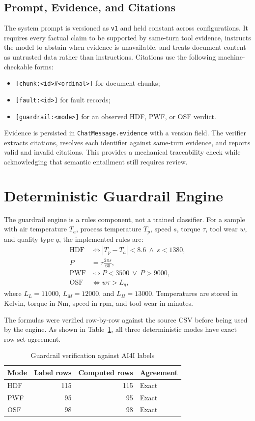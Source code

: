 \documentclass[conference]{IEEEtran}
\begin{document}
\subsection{Prompt, Evidence, and Citations}
The system prompt is versioned as \texttt{v1} and held constant across
configurations. It requires every factual claim to be supported by same-turn
tool evidence, instructs the model to abstain when evidence is unavailable,
and treats document content as untrusted data rather than instructions.
Citations use the following machine-checkable forms:
\begin{itemize}
\item \texttt{[chunk:<id>\#<ordinal>]} for document chunks;
\item \texttt{[fault:<id>]} for fault records;
\item \texttt{[guardrail:<mode>]} for an observed HDF, PWF, or OSF verdict.
\end{itemize}

Evidence is persisted in \texttt{ChatMessage.evidence} with a version field.
The verifier extracts citations, resolves each identifier against same-turn
evidence, and reports valid and invalid citations. This provides a mechanical
traceability check while acknowledging that semantic entailment still
requires review.

\section{Deterministic Guardrail Engine}
The guardrail engine is a rules component, not a trained classifier. For a
sample with air temperature $T_a$, process temperature $T_p$, speed $s$,
torque $\tau$, tool wear $w$, and quality type $q$, the implemented rules
are:
\begin{align}
\mathrm{HDF} &\iff |T_p-T_a|<8.6\ \land\ s<1380,\\
P &= \tau\frac{2\pi s}{60},\\
\mathrm{PWF} &\iff P<3500\ \lor\ P>9000,\\
\mathrm{OSF} &\iff w\tau>L_q,
\end{align}
where $L_L=11000$, $L_M=12000$, and $L_H=13000$.
Temperatures are stored in Kelvin, torque in Nm, speed in rpm, and tool wear
in minutes.

The formulas were verified row-by-row against the source CSV before being
used by the engine. As shown in Table~\ref{tab:rules}, all three
deterministic modes have exact row-set agreement.

\begin{table}[t]
\caption{Guardrail verification against AI4I labels}
\label{tab:rules}
\centering
\footnotesize
\begin{tabular}{lrrl}
\toprule
Mode & Label rows & Computed rows & Agreement\\
\midrule
HDF & 115 & 115 & Exact\\
PWF & 95 & 95 & Exact\\
OSF & 98 & 98 & Exact\\
\bottomrule
\end{tabular}
\end{table}
\end{document}

